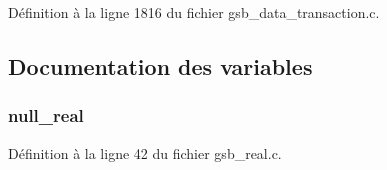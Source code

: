 Définition à la ligne 1816 du fichier gsb\_\-data\_\-transaction.c.



\subsection{Documentation des variables}
\subsubsection[{null\_\-real}]{ {\bf null\_\-real}}\label{gsb__data__transaction_8c_a26f304bec3fdc0651b9aa8765d4de3c6}


Définition à la ligne 42 du fichier gsb\_\-real.c.

